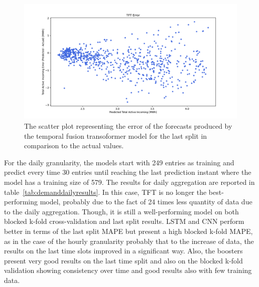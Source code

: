 \begin{figure}[H]
\centering
\includegraphics[width=1\textwidth]{images/demand/TFT_error_scatter_plot_predicted}
\caption{The scatter plot representing the error of the forecasts produced by the temporal fusion transoformer model for the last split in comparison to the actual values.}
\label{fig:demandtfthourlyforecastsscatterplot}
\end{figure}

For the daily granularity, the models start with 249 entries as training and predict every time 30 entries until reaching the last prediction instant where the model has a training size of 579.
The results for daily aggregation are reported in table~\ref{tab:demanddailyresults}.
In this case, TFT is no longer the best-performing model, probably due to the fact of 24 times less quantity of data due to the daily aggregation.
Though, it is still a well-performing model on both blocked k-fold cross-validation and last split results.
LSTM and CNN perform better in terms of the last split MAPE but present a high blocked k-fold MAPE, as in the case of the hourly granularity probably that to the increase of data, the results on the last time slots improved in a significant way.
Also, the boosters present very good results on the last time split and also on the blocked k-fold validation showing consistency over time and good results also with few training data. 

